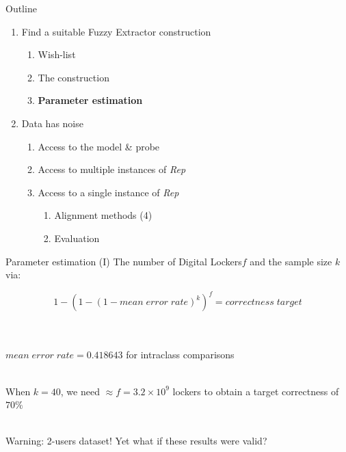 \documentclass{beamer}
\def\fe{Fuzzy Extractor\xspace}
\def\dls{Digital Lockers\xspace}
\newcommand{\rep}{\textit{Rep}\xspace}
\begin{document}
\begin{frame}{Outline}
   \begin{enumerate}
   \item Find a suitable \fe construction
\begin{enumerate}
    \item Wish-list
    \item The construction
    \item \textbf{Parameter estimation}\\
\end{enumerate}
   \item Data has noise
   \begin{enumerate}
       \item Access to the model \& probe
       \item Access to multiple instances of \rep
       \item Access to a single instance of \rep
        \begin{enumerate}
            \item Alignment methods (4)
            \item Evaluation
        \end{enumerate}
   \end{enumerate}    
\end{enumerate} 
\end{frame}
\begin{frame}{Parameter estimation (I)}
The number of \dls $f$ and the sample size $k$ via: 

$$ 1- \left(1 - \left(1 - mean\;error\;rate \right)^k\right)^f = correctness\;target$$\\~\pause


$mean\;error\;rate = 0.418643$ for intraclass comparisons\\~\pause

When $k=40$, we need $\approx f=3.2\times10^{9}$ lockers to obtain a target correctness of $70\%$ \\~\pause

\textcolor{dred}{Warning: 2-users dataset!} Yet what if these results were valid?

\end{frame}
\end{document}

